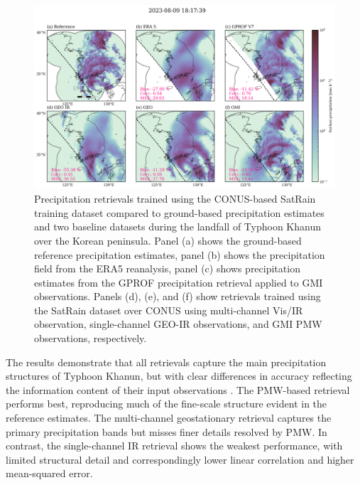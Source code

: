 \documentclass[11pt]{article}
\begin{document}
\begin{figure}[htbp] %
	\centering
	\includegraphics[width=1.0\textwidth]{figures/fig09}
	\caption{
	Precipitation retrievals trained using the CONUS-based SatRain
	training dataset compared to ground-based precipitation estimates and two
	baseline datasets during the landfall of Typhoon Khanun over the Korean
	peninsula. Panel (a) shows the ground-based reference precipitation
	estimates, panel (b) shows the precipitation field from the ERA5 reanalysis,
	panel (c) shows precipitation estimates from the GPROF precipitation
	retrieval applied to GMI observations. Panels (d), (e), and (f) show
	retrievals trained using the SatRain dataset over CONUS using multi-channel
	Vis/IR observation, single-channel GEO-IR observations, and GMI PMW
	observations, respectively.
	}
	\label{fig:case_study}
\end{figure}

The results demonstrate that all retrievals capture the main precipitation
structures of Typhoon Khanun, but with clear differences in accuracy reflecting
the information content of their input observations \citep{Kidd2011GPM}. The
PMW-based retrieval performs best, reproducing much of the fine-scale structure
evident in the reference estimates. The multi-channel geostationary retrieval
captures the primary precipitation bands but misses finer details resolved by
PMW. In contrast, the single-channel IR retrieval shows the weakest performance,
with limited structural detail and correspondingly lower linear correlation and
higher mean-squared error.
\end{document}
